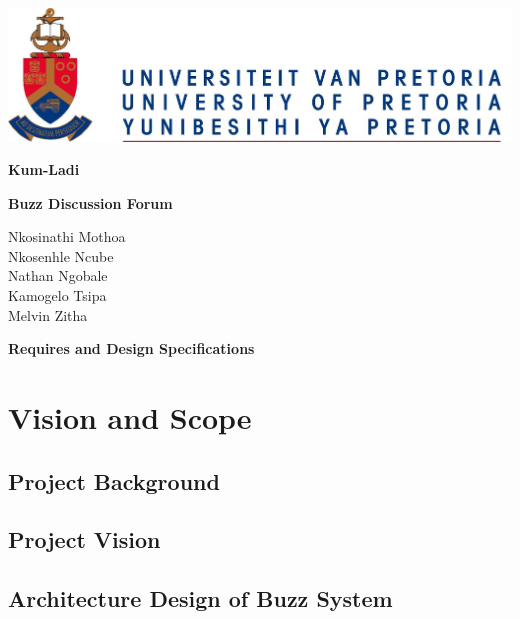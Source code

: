 \documentclass[12pt]{article}
\begin{document}
	 \begin{titlepage}
		 \begin{center}
			 \includegraphics[scale=1]{Diagrams/up.png}
			 \\
			 \begin{huge}
			 	 \textbf{Kum-Ladi}

				  \textbf{Buzz Discussion Forum}\\
			 \end{huge}

			 \begin{small}
				 Nkosinathi Mothoa\\
				 Nkosenhle Ncube\\
			 	 Nathan Ngobale\\
			 	 Kamogelo Tsipa\\
			 	 Melvin Zitha\\ 
			 \end{small}

			 \begin{huge}
				 \textbf{Requires and Design Specifications}
			 \end{huge}

		 \end{center}
	 \end{titlepage}

	 \section{Vision and Scope}
		 \subsection{Project Background}

		 \subsection{Project Vision} 

		 \subsection{Architecture Design of Buzz System}
\end{document}
